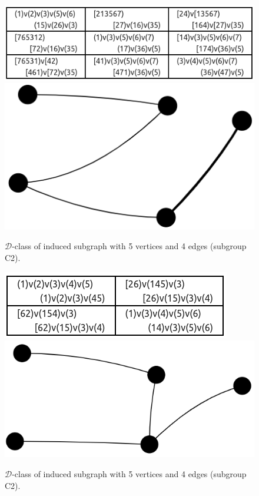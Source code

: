 \begin{appendices}
\begin{figure}[H]
\includegraphics[scale=0.25]{images/x9/x9_5v_4e_1.png}
\includegraphics[scale=0.1]{images/x9/x9_5v_4e_1_vis.png}
\caption{$\mathcal{D}$-class of induced subgraph with 5 vertices and 4 edges (subgroup C2).}
\end{figure}

\begin{figure}[H]
\includegraphics[scale=0.25]{images/x9/x9_5v_4e_2.png}
\includegraphics[scale=0.1]{images/x9/x9_5v_4e_2_vis.png}
\caption{$\mathcal{D}$-class of induced subgraph with 5 vertices and 4 edges (subgroup C2).}
\end{figure}


\end{appendices}
